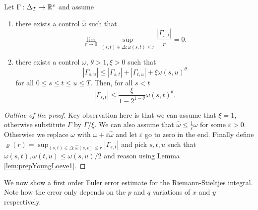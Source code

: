 \begin{lemma}\label{lem:prepYoungLoeve2}
    Let \( \Gamma: \Delta_T \rightarrow \mathbb{R}^e \) and assume 
    \begin{enumerate}
        \item there exists a control \( \hat{\omega} \) such that
        \begin{equation}
            \lim_{r \rightarrow 0} \sup_{(s,t) \in \Delta: \hat{\omega}(s,t) \le r} \frac{|\Gamma_{s,t}|}{r} = 0.
        \end{equation}
        \item there exists a control \( \omega \), \( \theta > 1, \xi > 0 \) such that
        \begin{equation}
            |\Gamma_{s,u}| \le |\Gamma_{s,t}| + |\Gamma_{t,u}| + \xi \omega(s,u)^\theta
        \end{equation}
        for all \( 0 \le s \le t \le u \le T \). 
        Then, for all \( s < t \) 
        \begin{equation}
            |\Gamma_{s,t}| \le \frac{\xi}{1 - 2^{1 - \theta}} \omega(s,t)^\theta.
        \end{equation}
    \end{enumerate}
\end{lemma}
\begin{proof}[Outline of the proof]
    Key observation here is that we can assume that \( \xi = 1 \), otherwise substitute \( \Gamma \) by \( \Gamma / \xi. \)
    We can also assume that \( \hat{\omega} \le \frac{1}{\varepsilon} \omega \) for some \( \varepsilon > 0. \)
    Otherwise we replace \( \omega \) with \( \omega + \varepsilon \hat{\omega} \) and let \( \varepsilon \) go to zero in the end.
    Finally define \( \varrho(r) = \sup_{(s,t) \in \Delta: \hat{\omega}(s,t) \le r} |\Gamma_{s,t}| \) and pick \( s, t, u \) such that \( \omega(s,t), \omega(t,u) \le \omega(s,u) / 2 \) and reason using Lemma \ref{lem:prepYoungLoeve1}.
\end{proof}

We now show a first order Euler error estimate for the Riemann-Stieltjes integral.
Note how the error only depends on the \( p \) and \( q \) variations of \( x \) and \( y \) respectively. 

